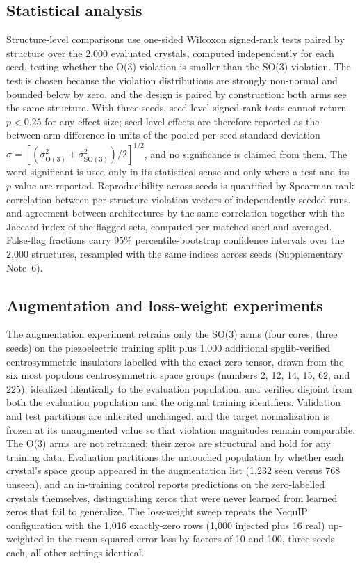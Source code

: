 \subsection*{Statistical analysis}

Structure-level comparisons use one-sided Wilcoxon signed-rank tests paired by structure over the 2,000 evaluated crystals, computed independently for each seed, testing whether the O(3) violation is smaller than the SO(3) violation. The test is chosen because the violation distributions are strongly non-normal and bounded below by zero, and the design is paired by construction: both arms see the same structure. With three seeds, seed-level signed-rank tests cannot return $p<0.25$ for any effect size; seed-level effects are therefore reported as the between-arm difference in units of the pooled per-seed standard deviation $\sigma = [(\sigma_{\mathrm{O(3)}}^{2}+\sigma_{\mathrm{SO(3)}}^{2})/2]^{1/2}$, and no significance is claimed from them. The word significant is used only in its statistical sense and only where a test and its $p$-value are reported. Reproducibility across seeds is quantified by Spearman rank correlation between per-structure violation vectors of independently seeded runs, and agreement between architectures by the same correlation together with the Jaccard index of the flagged sets, computed per matched seed and averaged. False-flag fractions carry 95\% percentile-bootstrap confidence intervals over the 2,000 structures, resampled with the same indices across seeds (Supplementary Note~6).

\subsection*{Augmentation and loss-weight experiments}

The augmentation experiment retrains only the SO(3) arms (four cores, three seeds) on the piezoelectric training split plus 1,000 additional spglib-verified centrosymmetric insulators labelled with the exact zero tensor, drawn from the six most populous centrosymmetric space groups (numbers 2, 12, 14, 15, 62, and 225), idealized identically to the evaluation population, and verified disjoint from both the evaluation population and the original training identifiers. Validation and test partitions are inherited unchanged, and the target normalization is frozen at its unaugmented value so that violation magnitudes remain comparable. The O(3) arms are not retrained: their zeros are structural and hold for any training data. Evaluation partitions the untouched population by whether each crystal's space group appeared in the augmentation list (1,232 seen versus 768 unseen), and an in-training control reports predictions on the zero-labelled crystals themselves, distinguishing zeros that were never learned from learned zeros that fail to generalize. The loss-weight sweep repeats the NequIP configuration with the 1,016 exactly-zero rows (1,000 injected plus 16 real) up-weighted in the mean-squared-error loss by factors of 10 and 100, three seeds each, all other settings identical.

